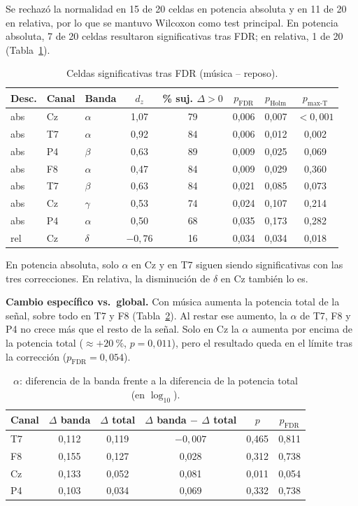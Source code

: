 \documentclass[11pt,a4paper]{article}
\begin{document}
Se rechazó la normalidad en 15 de 20 celdas en potencia absoluta y en 11 de 20 en relativa, por lo que se mantuvo Wilcoxon como test principal. En potencia absoluta, 7 de 20 celdas resultaron significativas tras FDR; en relativa, 1 de 20 (Tabla~\ref{tab:tests2}).

\begin{table}[H]
\centering
\caption{Celdas significativas tras FDR (música -- reposo).}
\label{tab:tests2}
\begin{tabular}{lllccccc}
\toprule
Desc. & Canal & Banda & $d_z$ & \% suj. $\Delta>0$ & $p_{\text{FDR}}$ & $p_{\text{Holm}}$ & $p_{\text{max-T}}$ \\
\midrule
abs & Cz & $\alpha$ & 1,07 & 79 & 0,006 & 0,007 & $<0{,}001$ \\
abs & T7 & $\alpha$ & 0,92 & 84 & 0,006 & 0,012 & 0,002 \\
abs & P4 & $\beta$ & 0,63 & 89 & 0,009 & 0,025 & 0,069 \\
abs & F8 & $\alpha$ & 0,47 & 84 & 0,009 & 0,029 & 0,360 \\
abs & T7 & $\beta$ & 0,63 & 84 & 0,021 & 0,085 & 0,073 \\
abs & Cz & $\gamma$ & 0,53 & 74 & 0,024 & 0,107 & 0,214 \\
abs & P4 & $\alpha$ & 0,50 & 68 & 0,035 & 0,173 & 0,282 \\
rel & Cz & $\delta$ & $-0{,}76$ & 16 & 0,034 & 0,034 & 0,018 \\
\bottomrule
\end{tabular}
\end{table}

En potencia absoluta, solo $\alpha$ en Cz y en T7 siguen siendo significativas con las tres correcciones. En relativa, la disminución de $\delta$ en Cz también lo es.

\textbf{Cambio específico vs.\ global.} Con música aumenta la potencia total de la señal, sobre todo en T7 y F8 (Tabla~\ref{tab:espec2}). Al restar ese aumento, la $\alpha$ de T7, F8 y P4 no crece más que el resto de la señal. Solo en Cz la $\alpha$ aumenta por encima de la potencia total ($\approx +20~\%$, $p = 0{,}011$), pero el resultado queda en el límite tras la corrección ($p_{\text{FDR}} = 0{,}054$).

\begin{table}[H]
\centering
\caption{$\alpha$: diferencia de la banda frente a la diferencia de la potencia total (en $\log_{10}$).}
\label{tab:espec2}
\begin{tabular}{lccccc}
\toprule
Canal & $\Delta$ banda & $\Delta$ total & $\Delta$ banda $-$ $\Delta$ total & $p$ & $p_{\text{FDR}}$ \\
\midrule
T7 & 0,112 & 0,119 & $-0{,}007$ & 0,465 & 0,811 \\
F8 & 0,155 & 0,127 & 0,028 & 0,312 & 0,738 \\
Cz & 0,133 & 0,052 & 0,081 & 0,011 & 0,054 \\
P4 & 0,103 & 0,034 & 0,069 & 0,332 & 0,738 \\
\bottomrule
\end{tabular}
\end{table}
\end{document}
